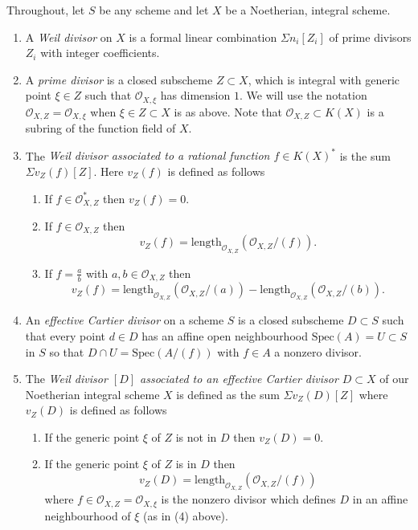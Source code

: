\begin{definition}
\label{definition-divisor}
Throughout, let $S$ be any scheme and let
$X$ be a Noetherian, integral scheme.
\begin{enumerate}
\item A {\it Weil divisor} on $X$ is a formal linear combination
$\Sigma n_i[Z_i]$ of prime divisors $Z_i$ with integer coefficients.
\item A {\it prime divisor} is a closed subscheme $Z \subset X$,
which is integral with generic point $\xi \in Z$ such that
${\mathcal O}_{X, \xi}$ has dimension $1$. We will use the notation
${\mathcal O}_{X, Z} = {\mathcal O}_{X, \xi}$
when $\xi \in Z \subset X$ is as above. Note that ${\mathcal O}_{X, Z} \subset
K(X)$ is a subring of the function field of $X$.
\item The {\it Weil divisor associated to a rational function
$f \in K(X)^\ast$} is the sum $\Sigma v_Z(f)[Z]$. Here $v_Z(f)$ is
defined as follows
\begin{enumerate}
\item If $f \in {\mathcal O}_{X, Z}^\ast$ then $v_Z(f) = 0$.
\item If $f \in {\mathcal O}_{X, Z}$ then
$$
v_Z(f) = \text{length}_{{\mathcal O}_{X, Z}}({\mathcal O}_{X, Z}/(f)).
$$
\item If $f = \frac{a}{b}$ with $a, b \in {\mathcal O}_{X, Z}$
then
$$
v_Z(f) = \text{length}_{{\mathcal O}_{X, Z}}({\mathcal O}_{X, Z}/(a)) -
\text{length}_{{\mathcal O}_{X, Z}}({\mathcal O}_{X, Z}/(b)).
$$
\end{enumerate}
\item An {\it effective Cartier divisor} on a scheme $S$
is a closed subscheme $D \subset S$ such that every point $d\in D$
has an affine open neighbourhood $\text{Spec}(A) = U \subset S$ in $S$
so that $D \cap U = \text{Spec}(A/(f))$ with $f \in A$ a nonzero divisor.
\item The {\it Weil divisor $[D]$ associated to an effective
Cartier divisor $D \subset X$} of our Noetherian integral
scheme $X$ is defined as the sum $\Sigma v_Z(D)[Z]$ where
$v_Z(D)$ is defined as follows
\begin{enumerate}
\item If the generic point $\xi$ of $Z$ is not in $D$
then $v_Z(D) = 0$.
\item If the generic point $\xi$ of $Z$ is in $D$
then
$$
v_Z(D) = \text{length}_{{\mathcal O}_{X, Z}}({\mathcal O}_{X, Z}/(f))
$$
where $f \in {\mathcal O}_{X, Z} = {\mathcal O}_{X, \xi}$ is the nonzero divisor
which defines $D$ in an affine neighbourhood of $\xi$ (as in (4) above).

\end{enumerate}
\end{enumerate}
\end{definition}
